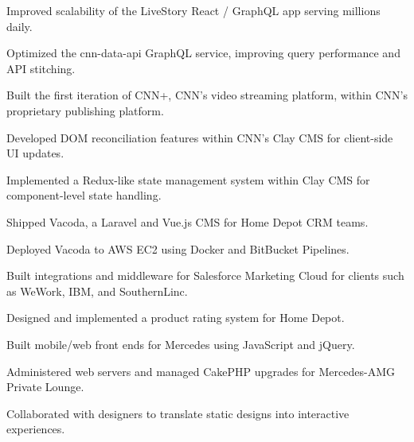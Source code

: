 \documentclass[]{pb-resume}
\begin{document}
\begin{minipage}[t]{0.66\textwidth}
\vspace{0pt} %
\begin{tightemize}
\item Improved scalability of the LiveStory React / GraphQL app serving millions daily.
\item Optimized the cnn-data-api GraphQL service, improving query performance and API stitching.
\item Built the first iteration of CNN+, CNN's video streaming platform, within CNN's proprietary publishing platform.
\item Developed DOM reconciliation features within CNN's Clay CMS for client-side UI updates.
\item Implemented a Redux-like state management system within Clay CMS for component-level state handling.
\end{tightemize}
\sectionsep

\vspace{0pt} %
\begin{tightemize}
\item Shipped Vacoda, a Laravel and Vue.js CMS for Home Depot CRM teams.
\item Deployed Vacoda to AWS EC2 using Docker and BitBucket Pipelines.
\item Built integrations and middleware for Salesforce Marketing Cloud for clients such as WeWork, IBM, and SouthernLinc.
\item Designed and implemented a product rating system for Home Depot.
\end{tightemize}  
\sectionsep

\vspace{0pt} %
\begin{tightemize}
\item Built mobile/web front ends for Mercedes using JavaScript and jQuery.
\item Administered web servers and managed CakePHP upgrades for Mercedes-AMG Private Lounge.
\item Collaborated with designers to translate static designs into interactive experiences.
\end{tightemize}
\sectionsep

\end{minipage} 
\end{document}
